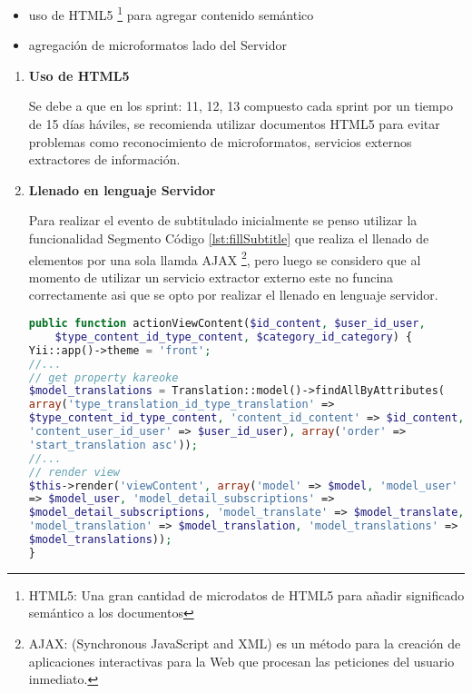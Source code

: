 \begin{itemize}

\item uso de HTML5 \footnote{HTML5: Una gran cantidad de microdatos de HTML5
para a\~nadir significado sem\'{a}ntico a los documentos} para agregar 
contenido sem\'{a}ntico
\item agregaci\'{o}n de microformatos lado del Servidor

\end{itemize}

\begin{enumerate}

\item \textbf{Uso de HTML5}

Se debe a que en los sprint: 11, 12, 13 compuesto cada sprint por un tiempo de
15 d\'{i}as h\'{a}viles, se recomienda utilizar documentos HTML5 para evitar
problemas como reconocimiento de microformatos, servicios externos extractores
de informaci\'{o}n.

\item \textbf{Llenado en lenguaje Servidor}

Para realizar el evento de subtitulado inicialmente se penso utilizar la 
funcionalidad Segmento C\'{o}digo \ref{lst:fillSubtitle} que realiza el llenado
de elementos por una sola llamda AJAX \footnote{AJAX: (Synchronous JavaScript 
and XML) es un m\'{e}todo para la creaci\'{o}n de aplicaciones interactivas para
la Web que procesan las peticiones del usuario inmediato.}, pero luego se 
considero que al momento de utilizar un servicio extractor externo este no 
funcina correctamente asi que se opto por realizar el llenado en lenguaje 
servidor.

\begin{lstlisting}[language = PHP]
public function actionViewContent($id_content, $user_id_user, 
    $type_content_id_type_content, $category_id_category) {
Yii::app()->theme = 'front';
//...
// get property kareoke
$model_translations = Translation::model()->findAllByAttributes(
array('type_translation_id_type_translation' => 
$type_content_id_type_content, 'content_id_content' => $id_content,
'content_user_id_user' => $user_id_user), array('order' => 
'start_translation asc'));
//...
// render view
$this->render('viewContent', array('model' => $model, 'model_user'
=> $model_user, 'model_detail_subscriptions' => 
$model_detail_subscriptions, 'model_translate' => $model_translate,
'model_translation' => $model_translation, 'model_translations' => 
$model_translations));
}
\end{lstlisting}

\end{enumerate}

